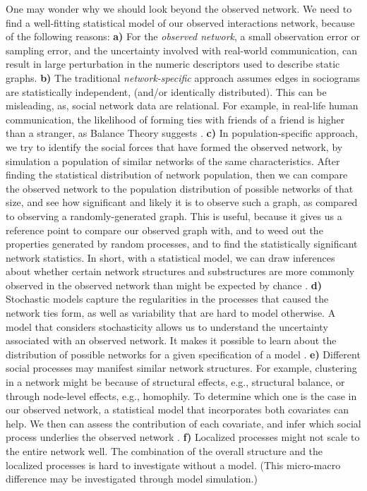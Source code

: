 \documentclass{acm_proc_article-sp}
\begin{document}
One may wonder why we should look beyond the observed network. We need to find a well-fitting statistical model of our observed interactions network, because of the following reasons: \textbf{a)} For the \textit{observed network}, a small observation error or sampling error, and the uncertainty involved with real-world communication, can result in large perturbation in the numeric descriptors used to describe static graphs. \textbf{b)} The traditional \textit{network-specific} approach assumes edges in sociograms are statistically independent, (and/or identically distributed). This can be misleading, as, social network data are relational. For example, in real-life human communication, the likelihood of forming ties with friends of a friend is higher than a stranger, as Balance Theory suggests \cite{Heider}. \textbf{c)} In population-specific approach, we try to identify the social forces that have formed the observed network, by simulation a population of similar networks of the same characteristics. After finding the statistical distribution of network population, then we can compare the observed network to the population distribution of possible networks of that size, and see how significant and likely it is to observe such a graph, as compared to observing a randomly-generated graph. This is useful, because it gives us a reference point to compare our observed graph with, and to weed out the properties generated by random processes, and to find the statistically significant network statistics. In short, with a statistical model, we can draw inferences about whether certain network structures and substructures are more commonly observed in the observed network than might be expected by chance \cite{Robins}. \textbf{d)} Stochastic models capture the regularities in the processes that caused the network ties form, as well as variability that are hard to model otherwise. A model that considers stochasticity allows us to understand the uncertainty associated with an observed network. It makes it possible to learn about the distribution of possible networks for a given specification of a model \cite{Robins}. \textbf{e)} Different social processes may manifest similar network structures. For example, clustering in a network might be because of structural effects, e.g., structural balance, or through node-level effects, e.g., homophily. To determine which one is the case in our observed network, a statistical model that incorporates both covariates can help. We then can assess the contribution of each covariate, and infer which social process underlies the observed network \cite{Robins}. \textbf{f)} Localized processes might not scale to the entire network well. The combination of the overall structure and the localized processes is hard to investigate without a model. (This micro-macro difference may be investigated through model simulation.)\cite{Robins}
\end{document}
